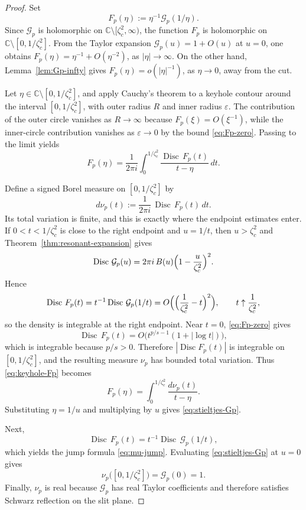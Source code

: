 \documentclass[11pt]{amsart}
\numberwithin{equation}{section}
\theoremstyle{plain}
\theoremstyle{definition}
\theoremstyle{remark}
\newcommand{\CC}{\mathbb{C}}
\DeclareMathOperator{\Disc}{Disc}
\begin{document}
\begin{proof}
	Set
	\[
		F_p(\eta):=\eta^{-1}\mathcal G_p(1/\eta).
	\]
	Since \(\mathcal G_p\) is holomorphic on
	\(\CC\setminus[\zeta_c^2,\infty)\), the function \(F_p\) is holomorphic on
	\(\CC\setminus[0,1/\zeta_c^2]\). From the Taylor expansion
	\(\mathcal G_p(u)=1+O(u)\) at \(u=0\), one obtains $F_p(\eta)=\eta^{-1}+O(\eta^{-2})$, as $|\eta|\to\infty$. On the other hand, Lemma~\ref{lem:Gp-infty} gives $F_p(\eta)=o(|\eta|^{-1})$,
	as	$\eta\to0$,	away from the cut.

	Let \(\eta\in\CC\setminus[0,1/\zeta_c^2]\), and apply Cauchy’s theorem to a
	keyhole contour around the interval \([0,1/\zeta_c^2]\), with outer radius
	\(R\) and inner radius \(\varepsilon\). The contribution of the outer circle
	vanishes as \(R\to\infty\) because \(F_p(\xi)=O(\xi^{-1})\), while the
	inner-circle contribution vanishes as \(\varepsilon\to0\) by the bound
	\eqref{eq:Fp-zero}. Passing to the limit yields
	\begin{equation}\label{eq:keyhole-Fp}
		F_p(\eta)
		=
		\frac{1}{2\pi i}\int_0^{1/\zeta_c^2}
		\frac{\Disc\,F_p(t)}{t-\eta}\,dt.
	\end{equation}

	Define a signed Borel measure on \([0,1/\zeta_c^2]\) by
	\[
		d\nu_p(t):=\frac{1}{2\pi i}\,\Disc\,F_p(t)\,dt.
	\]
	Its total variation is finite, and this is exactly where the endpoint
	estimates enter. If \(0<t<1/\zeta_c^2\) is close to the right endpoint and
	\(u=1/t\), then \(u>\zeta_c^2\) and Theorem~\ref{thm:resonant-expansion}
	gives
	\[
		\Disc\,\mathcal G_p(u)
		=
		2\pi i\,B(u)\Bigl(1-\frac{u}{\zeta_c^2}\Bigr)^2.
	\]
	Hence
	\[
		\Disc\,F_p(t)
		=
		t^{-1}\Disc\,\mathcal G_p(1/t)
		=
		O\Bigl(\Bigl(\frac1{\zeta_c^2}-t\Bigr)^2\Bigr),
		\qquad t\uparrow \frac1{\zeta_c^2},
	\]
	so the density is integrable at the right endpoint. Near \(t=0\),
	\eqref{eq:Fp-zero} gives
	\[
		\Disc\,F_p(t)=O\bigl(t^{p/s-1}(1+|\log t|)\bigr),
	\]
	which is integrable because \(p/s>0\). Therefore \(|\Disc F_p(t)|\) is
	integrable on \([0,1/\zeta_c^2]\), and the resulting measure \(\nu_p\) has
	bounded total variation. Thus \eqref{eq:keyhole-Fp} becomes
	\[
		F_p(\eta)=\int_0^{1/\zeta_c^2}\frac{d\nu_p(t)}{t-\eta}.
	\]
	Substituting \(\eta=1/u\) and multiplying by \(u\) gives
	\eqref{eq:stieltjes-Gp}.

	Next,
	\[
		\Disc\,F_p(t)=t^{-1}\Disc\,\mathcal G_p(1/t),
	\]
	which yields the jump formula \eqref{eq:mu-jump}. Evaluating
	\eqref{eq:stieltjes-Gp} at \(u=0\) gives
	\[
		\nu_p\bigl([0,1/\zeta_c^2]\bigr)=\mathcal G_p(0)=1.
	\]
	Finally, \(\nu_p\) is real because \(\mathcal G_p\) has real Taylor
	coefficients and therefore satisfies Schwarz reflection on the slit plane.
\end{proof}
\end{document}
